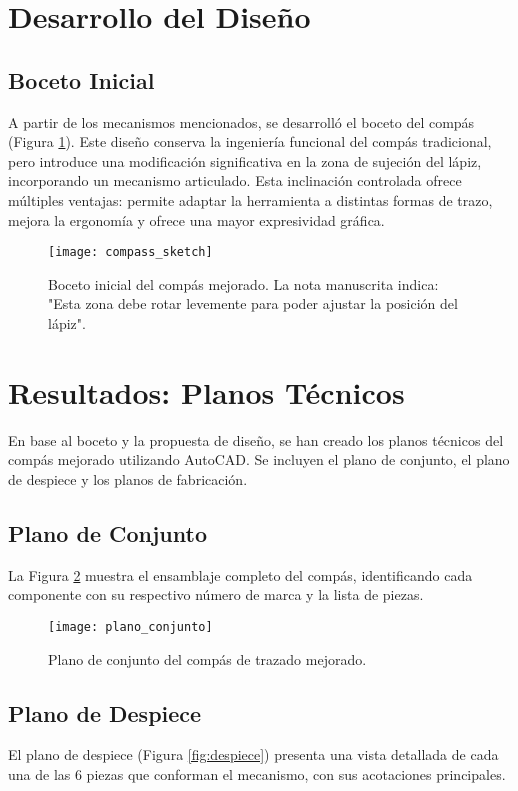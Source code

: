 \documentclass[11pt, a4paper]{article}
\begin{document}
\section{Desarrollo del Diseño}
\subsection{Boceto Inicial}
A partir de los mecanismos mencionados, se desarrolló el boceto del compás (Figura \ref{fig:boceto}). Este diseño conserva la ingeniería funcional del compás tradicional, pero introduce una modificación significativa en la zona de sujeción del lápiz, incorporando un mecanismo articulado.
Esta inclinación controlada ofrece múltiples ventajas: permite adaptar la herramienta a distintas formas de trazo, mejora la ergonomía y ofrece una mayor expresividad gráfica.

\begin{figure}[htbp]
    \centering
    \texttt{[image: compass\_sketch]}
    \caption{Boceto inicial del compás mejorado. La nota manuscrita indica: "Esta zona debe rotar levemente para poder ajustar la posición del lápiz".}
    \label{fig:boceto}
\end{figure}
\newpage

\section{Resultados: Planos Técnicos}
En base al boceto y la propuesta de diseño, se han creado los planos técnicos del compás mejorado utilizando AutoCAD. Se incluyen el plano de conjunto, el plano de despiece y los planos de fabricación.

\subsection{Plano de Conjunto}
La Figura \ref{fig:conjunto} muestra el ensamblaje completo del compás, identificando cada componente con su respectivo número de marca y la lista de piezas.

\begin{figure}[htbp]
    \centering
    \texttt{[image: plano\_conjunto]}
    \caption{Plano de conjunto del compás de trazado mejorado.}
    \label{fig:conjunto}
\end{figure}
\newpage

\subsection{Plano de Despiece}
El plano de despiece (Figura \ref{fig:despiece}) presenta una vista detallada de cada una de las 6 piezas que conforman el mecanismo, con sus acotaciones principales.
\end{document}
